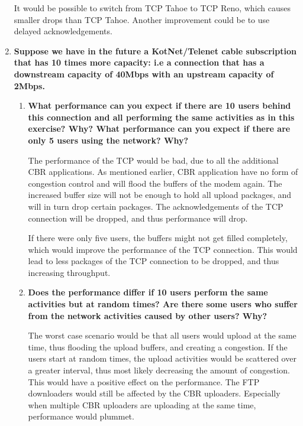 \begin{enumerate}
		It would be possible to switch from \ac{TCP} Tahoe to \ac{TCP} Reno, which causes smaller drops than \ac{TCP} Tahoe. Another improvement could be to use delayed acknowledgements. 		
		
		\item \textbf{Suppose we have in the future a KotNet/Telenet cable subscription that has 10 times more capacity: i.e a connection that has a downstream capacity of 40Mbps with an upstream capacity of 2Mbps.}
		
			\begin{enumerate}
			  	\item \textbf{What performance can you expect if there are 10 users behind this connection and all performing the same activities as in this exercise? Why? What performance can you expect if there are only 5 users using the network? Why?}
			  	
			  	The performance of the \ac{TCP} would be bad, due to all the additional \ac{CBR} applications. As mentioned earlier, \ac{CBR} application have no form of congestion control and will flood the buffers of the modem again. The increased buffer size will not be enough to hold all upload packages, and will in turn drop certain packages.  The acknowledgements of the \ac{TCP} connection will be dropped, and thus performance will drop. 
			  	
			  	If there were only five users, the buffers might not get filled completely, which would improve the performance of the \ac{TCP} connection. This would lead to less packages of the \ac{TCP} connection to be dropped, and thus increasing throughput. 
			  	
				\item \textbf{Does the performance differ if 10 users perform the same activities but at random times? Are there some users who suffer from the network activities caused by other users? Why?}
				
				The worst case scenario would be that all users would upload at the same time, thus flooding the upload buffers, and creating a congestion. If the users start at random times, the upload activities would be scattered over a greater interval, thus most likely decreasing the amount of congestion. This would have a positive effect on the performance. 
				The \ac{FTP} downloaders would still be affected by the \ac{CBR} uploaders. Especially when multiple \ac{CBR} uploaders are uploading at the same time, performance would plummet. 
			\end{enumerate}
	\end{enumerate}